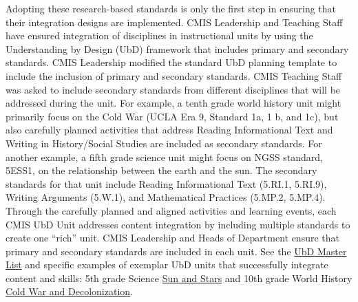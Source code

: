 \documentclass{report}
\begin{document}
\begin{findings}

Adopting these research-based standards is only the first step in ensuring that their integration designs are implemented. CMIS Leadership and Teaching Staff have ensured integration of disciplines in instructional units by using the Understanding by Design (UbD) framework that includes primary and secondary standards. CMIS Leadership modified the standard UbD planning template to include the inclusion of primary and secondary standards. CMIS Teaching Staff was asked to include secondary standards from different disciplines that will be addressed during the unit. For example, a tenth grade world history unit might primarily focus on the Cold War (UCLA Era 9, Standard 1a, 1 b, and 1c), but also carefully planned activities that address Reading Informational Text and Writing in History/Social Studies are included as secondary standards. For another example, a fifth grade science unit might focus on NGSS standard, 5ESS1, on the relationship between the earth and the sun. The secondary standards for that unit include Reading Informational Text (5.RI.1, 5.RI.9), Writing Arguments (5.W.1), and Mathematical Practices (5.MP.2, 5.MP.4). Through the carefully planned and aligned activities and learning events, each CMIS UbD Unit addresses content integration by including multiple  standards to create one ``rich'' unit. CMIS Leadership and Heads of Department ensure that primary and secondary standards are included in each unit. See the \href{https://docs.google.com/a/cmis.ac.th/document/d/1ai2pHgN5LfMH39fHhyltSgoXu4mHXESIZJy8zxWwnTQ/edit?usp=sharing}{UbD Master List} and specific examples of exemplar UbD units that successfully integrate content and skills: 5th grade Science \href{https://docs.google.com/a/cmis.ac.th/document/d/1MleNZcfzTrFoaZjuZ3KUoHXVj-M4iUok1Z-Kn7J89ig/edit?usp=sharing}{Sun and Stars} and 10th grade World History \href{https://docs.google.com/a/cmis.ac.th/document/d/1frGo6cvCkAkRJxEjcVsD9Ta9NOePFbclZCZFzOqbVPw/edit?usp=sharing}{Cold War and Decolonization}.



\end{findings}
\end{document}
